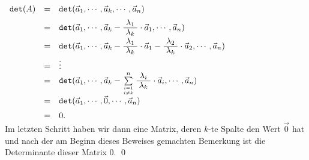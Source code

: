 \\[0.2cm]
\hspace*{1.3cm}
$
\begin{array}[t]{lcl}
  \mathtt{det}(A) & = & \mathtt{det}(\vec{a}_1, \cdots, \vec{a}_k, \cdots, \vec{a}_n) \\[0.2cm]
                  & = & \mathtt{det}(\vec{a}_1, \cdots, 
                        \vec{a}_k - \bruch{\lambda_1}{\lambda_k} \cdot \vec{a}_1, \cdots, \vec{a}_n) \\[0.2cm]
                  & = & \mathtt{det}(\vec{a}_1, \cdots, 
                        \vec{a}_k -\bruch{\lambda_1}{\lambda_k} \cdot \vec{a}_1 - \bruch{\lambda_2}{\lambda_k} \cdot \vec{a}_2,
                        \cdots, \vec{a}_n) \\[0.2cm] 
                  & = & \vdots \\
                  & = & \mathtt{det}(\vec{a}_1, \cdots, 
                        \vec{a}_k - \sum\limits_{i=1 \atop i \not= k}^n \bruch{\lambda_i}{\lambda_k} \cdot \vec{a}_i,
                        \cdots, \vec{a}_n) \\[0.2cm] 
                  & = & \mathtt{det}(\vec{a}_1, \cdots, 
                        \vec{0},
                        \cdots, \vec{a}_n) \\[0.2cm] 
                 & = & 0.
\end{array}
$
\\[0.2cm]
Im letzten Schritt haben wir dann eine Matrix, deren $k$-te Spalte den Wert $\vec{0}$ hat und
nach der am Beginn dieses Beweises gemachten Bemerkung ist die Determinante dieser Matrix $0$.
\qed


